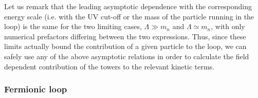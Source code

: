 		
Let us remark that the leading asymptotic dependence with the corresponding energy scale (i.e. with the UV cut-off or the mass of the particle running in the loop) is the same for the two limiting cases, $\Lambda \gg m_n$ and $\Lambda\simeq m_n$, with only numerical prefactors differing between the two expressions. Thus, since these limits actually bound the contribution of a given particle to the loop, we can safely use any of the above asymptotic relations in order to calculate the field dependent contribution of the towers to the relevant kinetic terms.
		
		
		
\subsubsection*{Fermionic loop}
		
